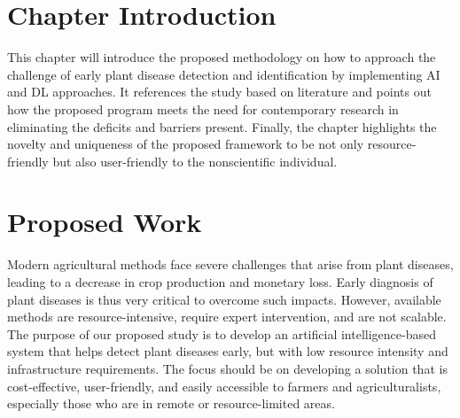 \label{chap.3}
\section {Chapter Introduction}
This chapter will introduce the proposed methodology on how to approach the challenge of early plant disease detection and identification by implementing AI and DL approaches. It references the study based on literature and points out how the proposed program meets the need for contemporary research in eliminating the deficits and barriers present. Finally, the chapter highlights the novelty and uniqueness of the proposed framework to be not only resource-friendly but also user-friendly to the nonscientific individual.
\section{Proposed Work}

Modern agricultural methods face severe challenges that arise from plant diseases, leading to a decrease in crop production and monetary loss. Early diagnosis of plant diseases is thus very critical to overcome such impacts. However, available methods are resource-intensive, require expert intervention, and are not scalable. The purpose of our proposed study is to develop an artificial intelligence-based system that helps detect plant diseases early, but with low resource intensity and infrastructure requirements. The focus should be on developing a solution that is cost-effective, user-friendly, and easily accessible to farmers and agriculturalists, especially those who are in remote or resource-limited areas.

\

